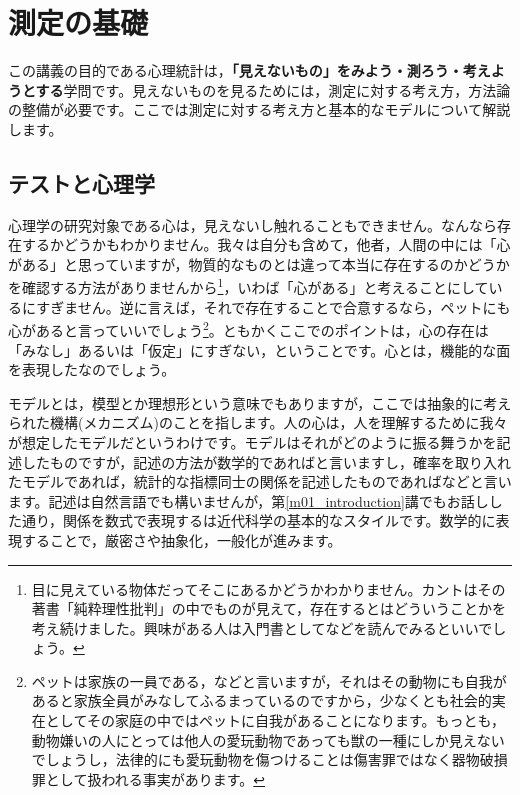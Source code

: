 \documentclass{ltjbook}
\begin{document}
\chapter{測定の基礎}
\label{m06_ctt}

この講義の目的である心理統計は，\textbf{「見えないもの」をみよう・測ろう・考えようとする}学問です。見えないものを見るためには，測定に対する考え方，方法論の整備が必要です。ここでは測定に対する考え方と基本的なモデルについて解説します。
\section{テストと心理学}
心理学の研究対象である心は，見えないし触れることもできません。なんなら存在するかどうかもわかりません。我々は自分も含めて，他者，人間の中には「心がある」と思っていますが，物質的なものとは違って本当に存在するのかどうかを確認する方法がありませんから\footnote{目に見えている物体だってそこにあるかどうかわかりません。カントはその著書「純粋理性批判」\parencite{Kant1961}の中でものが見えて，存在するとはどういうことかを考え続けました。興味がある人は入門書として\textcite{Kurosaki2000}などを読んでみるといいでしょう。}，いわば「心がある」と考えることにしているにすぎません。逆に言えば，それで存在することで合意するなら，ペットにも心があると言っていいでしょう\footnote{ペットは家族の一員である，などと言いますが，それはその動物にも自我があると家族全員がみなしてふるまっているのですから，少なくとも社会的実在としてその家庭の中ではペットに自我があることになります。もっとも，動物嫌いの人にとっては他人の愛玩動物であっても獣の一種にしか見えないでしょうし，法律的にも愛玩動物を傷つけることは傷害罪ではなく器物破損罪として扱われる事実があります。}。ともかくここでのポイントは，心の存在は「みなし」あるいは「仮定」にすぎない，ということです。心とは，機能的な面を表現したなのでしょう。

モデルとは，模型とか理想形という意味でもありますが，ここでは抽象的に考えられた機構(メカニズム)のことを指します。人の心は，人を理解するために我々が想定したモデルだというわけです。モデルはそれがどのように振る舞うかを記述したものですが，記述の方法が数学的であればと言いますし，確率を取り入れたモデルであれば，統計的な指標同士の関係を記述したものであればなどと言います。記述は自然言語でも構いませんが，第\ref{m01_introduction}講でもお話しした通り，関係を数式で表現するは近代科学の基本的なスタイルです。数学的に表現することで，厳密さや抽象化，一般化が進みます。
\end{document}
